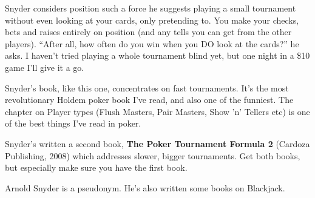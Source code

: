 Snyder considers position such a force he suggests playing a small
tournament without even looking at your cards, only pretending to. You make
your checks, bets and raises entirely on position (and any tells you can
get from the other players). ``After all, how often do you win when you
DO look at the cards?'' he asks. I haven't tried playing a whole tournament
blind yet, but one night in a \$10 game I'll give it a go.

Snyder's book, like this one, concentrates on fast tournaments. It's
the most revolutionary Holdem poker book I've read, and also one of
the funniest. The chapter on Player types (Flush Masters, Pair Masters,
Show 'n' Tellers etc) is one of the best things I've read in poker.

Snyder's written a second book, \textbf{The Poker Tournament Formula 2}
(Cardoza Publishing, 2008) which addresses slower, bigger
tournaments. Get both books, but especially make sure you have the
first book.

Arnold Snyder is a pseudonym. He's also written some books on Blackjack.
